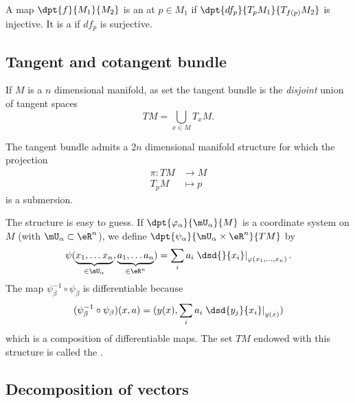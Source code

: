\begin{definition}
    A map $\dpt{f}{M_1}{M_2}$ is an  at $p\in M_1$ if $\dpt{df_p}{T_pM_1}{T_{f(p)}M_2}$ is injective. It is a  if $df_p$ is surjective.
\end{definition}

\subsection{Tangent and cotangent bundle}

If $M$ is a $n$ dimensional manifold, as set the tangent bundle is the \emph{disjoint} union of tangent spaces
\[
  TM=\bigcup_{x\in M}T_xM.
\]

\begin{theorem}
	The tangent bundle admits a $2n$ dimensional manifold structure for which the projection
	\begin{equation}
		\begin{aligned}
			\pi \colon TM &\to M\\
			T_pM&\mapsto p
		\end{aligned}
	\end{equation}
	is a submersion.
\end{theorem}

The structure is easy to guess. If $\dpt{\varphi_{\alpha}}{\mU_{\alpha}}{M}$ is a coordinate system on $M$ (with $\mU_{\alpha}\subset\eR^n$), we define $\dpt{\psi_{\alpha}}{\mU_{\alpha}\times \eR^n}{TM}$ by
\[
  \psi( \underbrace{x_1,\ldots x_n}_{\in\mU_{\alpha}},\underbrace{a_1,\ldots a_n}_{\in\eR^n}  )
          =\sum_i a_i\left.\dsd{}{x_i}\right|_{\varphi(x_1,\ldots,x_n)}.
\]
The map $\psi_{\beta}^{-1}\circ\psi_{\beta}$ is differentiable because
\[
(\psi_{\beta}^{-1}\circ\psi_{\beta})(x,a)=( y(x),\sum_i a_i\left.\dsd{y_j}{x_i}\right|_{y(x)}  )
\]
which is a composition of differentiable maps. The set $TM$ endowed with this structure is called the .


\subsection{Decomposition of vectors}

